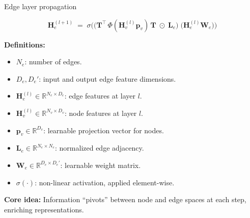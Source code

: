\documentclass[hyperref={colorlinks,citecolor=blue,linkcolor=blue,urlcolor=blue}]{beamer}
\begin{document}
\begin{frame}{Edge layer propagation}
\footnotesize

\[
\mathbf{H}_e^{(l+1)} \;=\; \sigma\Big(
\big( \mathbf{T}^\top \,\Phi(\mathbf{H}_v^{(l)}\mathbf{p}_v)\,\mathbf{T} \;\odot\; \mathbf{L}_e \big)
\; \big(\mathbf{H}_e^{(l)} \mathbf{W}_e \big)
\Big)
\]

\vspace{0.5cm}

\textbf{Definitions:}
\begin{itemize}\footnotesize
    \item \(N_e\): number of edges.
    \item \(D_e, D_e'\): input and output edge feature dimensions.
    \item \(\mathbf{H}_e^{(l)} \in \mathbb{R}^{N_e \times D_e}\): edge features at layer \(l\).
    \item \(\mathbf{H}_v^{(l)} \in \mathbb{R}^{N_v \times D_v}\): node features at layer \(l\).
    \item \(\mathbf{p}_v \in \mathbb{R}^{D_v}\): learnable projection vector for nodes.
    \item \(\mathbf{L}_e \in \mathbb{R}^{N_e \times N_e}\): normalized edge adjacency.
    \item \(\mathbf{W}_e \in \mathbb{R}^{D_e \times D_e'}\): learnable weight matrix.
    \item \(\sigma(\cdot)\): non-linear activation, applied element-wise.
\end{itemize}
\textbf{Core idea:} Information “pivots” between node and edge spaces at each step, enriching representations.

\end{frame}
\end{document}
